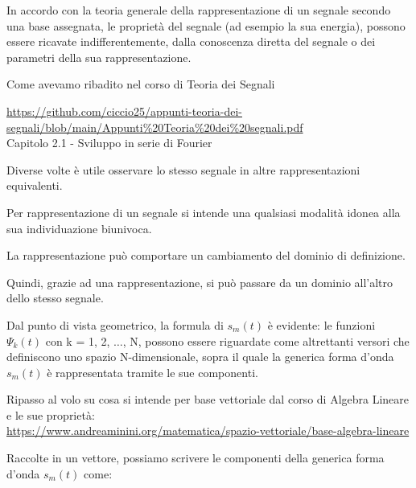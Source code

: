 In accordo con la teoria generale della rappresentazione di un segnale secondo una base assegnata, 
le proprietà del segnale (ad esempio la sua energia), possono essere ricavate indifferentemente, 
dalla conoscenza diretta del segnale o dei parametri della sua rappresentazione. \newline 

\begin{tcolorbox}
    Come avevamo ribadito nel corso di Teoria dei Segnali \newline 

    \url{https://github.com/ciccio25/appunti-teoria-dei-segnali/blob/main/Appunti%20Teoria%20dei%20segnali.pdf} \\
    Capitolo 2.1 - Sviluppo in serie di Fourier \newline 

    Diverse volte è utile osservare lo stesso segnale in altre rappresentazioni equivalenti. \newline 

    Per rappresentazione di un segnale si intende una qualsiasi modalità idonea alla sua individuazione 
    biunivoca. \newline 

    La rappresentazione può comportare un cambiamento del dominio di definizione. \newline  

    Quindi, grazie ad una rappresentazione, si può passare da un dominio all'altro dello stesso segnale. \newline 

\end{tcolorbox}

Dal punto di vista geometrico, la formula di $s_{m} (t)$ è evidente: 
le funzioni $\Psi_{k} (t)$ con k = 1, 2, $\dots$, N, possono essere riguardate come altrettanti versori che definiscono uno spazio N-dimensionale, 
sopra il quale la generica forma d'onda $s_{m} (t)$ è rappresentata tramite le sue componenti. \newline 

\begin{tcolorbox}
    Ripasso al volo su cosa si intende per base vettoriale dal corso di Algebra Lineare e le sue proprietà: \\
    \url{https://www.andreaminini.org/matematica/spazio-vettoriale/base-algebra-lineare} 
\end{tcolorbox}

Raccolte in un vettore, possiamo scrivere le componenti della generica forma d'onda $s_{m} (t)$ come: 

